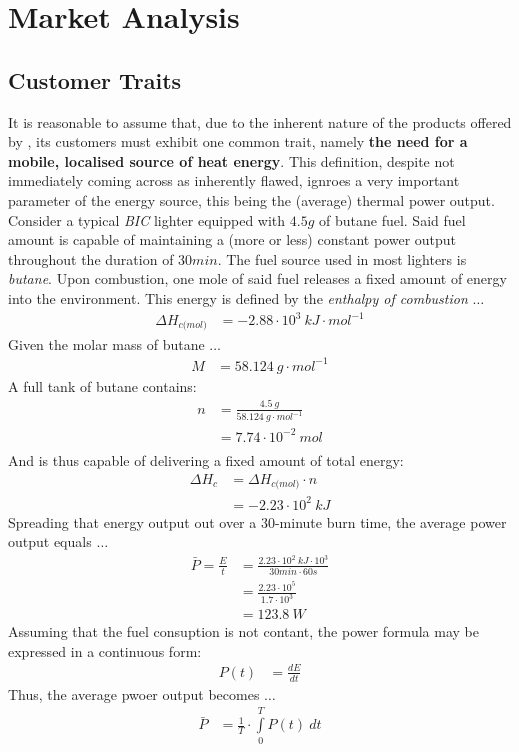 \section{Market Analysis}
\subsection{Customer Traits}
It is reasonable to assume that, due to the inherent nature of the products offered by \fw, its customers must
exhibit one common trait, namely \textbf{the need for a mobile, localised source of heat energy}.
This definition, despite not immediately coming across as inherently flawed, ignroes a very important parameter of the
energy source, this being the (average) thermal power output. \\[\baselineskip]
Consider a typical \textit{BIC} lighter equipped with $4.5g$ of butane fuel. Said fuel amount is capable of maintaining
a (more or less) constant power output throughout the duration of $30min$.
The fuel source used in most lighters is \textit{butane}. Upon combustion, one mole of said fuel
releases a fixed amount of energy into the environment. This energy is defined by the \textit{enthalpy of combustion} $\dots$
\begin{align*}
	\Delta H_{c\textit{(mol)}} &= -2.88 \cdot 10^3 \: kJ \cdot mol^{-1}
\end{align*}
Given the molar mass of butane $\dots$
\begin{align*}
	M &= 58.124 \: g \cdot mol^{-1}
\end{align*}
A full tank of butane contains:
\begin{align*}
	n &= \frac{4.5 \: g}{58.124 \: g \cdot mol^{-1}} \\
	  &= 7.74 \cdot 10^{-2} \: mol \\
\end{align*}
And is thus capable of delivering a fixed amount of total energy:
\begin{align*}
	\Delta H_c &= \Delta H_{c\textit{(mol)}} \cdot n \\
		   &= -2.23 \cdot 10^2 \: kJ
\end{align*}
Spreading that energy output out over a $30$-minute burn time, the average power output equals $\dots$
\begin{align*}
	\bar{P} = \frac{E}{t} &= \frac{2.23 \cdot 10^2 \: kJ \cdot 10^3}{30min \cdot 60s} \\
			&= \frac{2.23 \cdot 10^5}{1.7 \cdot 10^3} \\
			&= 123.8 \: W
\end{align*}
Assuming that the fuel consuption is not contant, the power formula may be expressed in a continuous form:
\begin{align*}
	P(t) &= \frac{dE}{dt}
\end{align*}
Thus, the average pwoer output becomes $\dots$
\begin{align*}
	\bar{P} &= \frac{1}{T} \cdot \int\limits_{0}^{T} P(t) \: dt
\end{align*}
